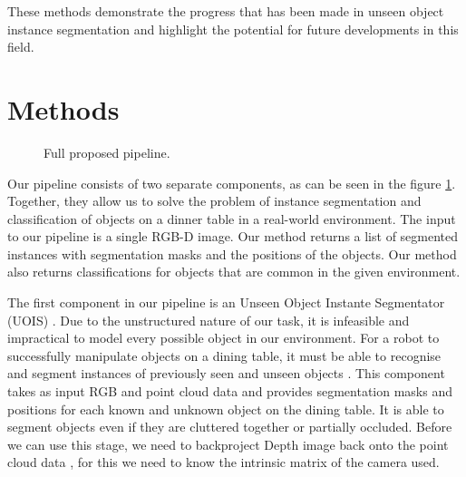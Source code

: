 \documentclass[10pt,twocolumn,letterpaper]{article}
\begin{document}
These methods demonstrate the progress that has been made in unseen object instance segmentation and highlight the potential for future developments in this field.


\section{Methods}


\begin{figure}
\begin{center}
\end{center}
   \caption{Full proposed pipeline. }
\label{fig:structure-graph}
\end{figure}



Our pipeline consists of two separate components, as can be seen in the figure \ref{fig:structure-graph}. Together, they allow us to solve the problem of instance segmentation and classification of objects on a dinner table in a real-world environment. The input to our pipeline is a single RGB-D image. Our method returns a list of segmented instances with segmentation masks and the positions of the objects. Our method also returns classifications for objects that are common in the given environment.

The first component in our pipeline is an Unseen Object Instante Segmentator (UOIS) \cite{Xie_Xiang_Mousavian_Fox_2021}. Due to the unstructured nature of our task, it is infeasible and impractical to model every possible object in our environment. For a robot to successfully manipulate objects on a dining table, it must be able to recognise and segment instances of previously seen and unseen objects \cite{Xie_Xiang_Mousavian_Fox_2020}. This component takes as input RGB and point cloud data and provides segmentation masks and positions for each known and unknown object on the dining table. It is able to segment objects even if they are cluttered together or partially occluded. Before we can use this stage, we need to backproject Depth image back onto the point cloud data \cite{Bostanci_Kanwal_Clark_2015}, for this we need to know the intrinsic matrix of the camera used.
\end{document}
